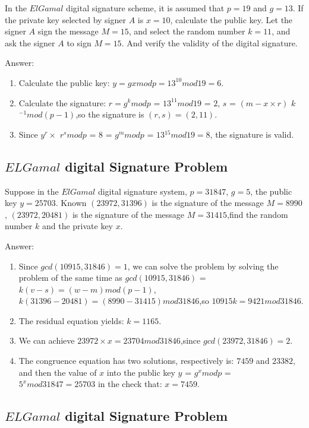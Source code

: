 \documentclass[paper=a4, fontsize=11pt]{scrartcl} %
\numberwithin{equation}{section} %
\numberwithin{figure}{section} %
\numberwithin{table}{section} %
\begin{document}
In the $ElGamal$ digital signature scheme, it is assumed that $p = 19$ and $g = 13$. If the private key selected by signer $A$ is $x = 10$, calculate the public key. Let the signer $A$ sign the message $M = 15$, and select the random number $k = 11$, and ask the signer $A$ to sign $M = 15$. And verify the validity of the digital signature.

Answer:
\begin{enumerate}
\item Calculate the public key: $y = gx mod p = 13^10 mod 19 = 6$.
\item Calculate the signature: $r=g^k mod p$ = $13^11mod 19$ = $2$, $s$ = $(m-x \times r)$ $k$$^{-1} mod (p-1)$,so the signature is $(r,s)=(2, 11)$.
\item Since $y ^ r \times $ $r^s mod p$ = 8 = $g^m mod p$ = $13$$^{15} mod 19 = 8$, the signature is valid.
\end{enumerate}


\subsection{$ELGamal$ digital Signature Problem \uppercase\expandafter{}}

Suppose in the $ElGamal$ digital signature system, $p = 31847$, $g = 5$, the public key $y = 25703$. Known $(23972,31396)$ is the signature of the message $M=8990$, $(23972,20481)$ is the signature of the message $M = 31415$,find the random number $k$ and the private key $x$.

Answer:
\begin{enumerate}
\item Since $gcd (10915, 31846) = 1$, we can solve the problem by solving the problem of the same time  as $gcd (10915, 31846)$ =$ k (v-s) = (w-m) mod (p-1)$,$k (31396-20481) = (8990-31415) mod 31846$,so $10915k = 9421 mod 31846$.
\item The residual equation yields: $k = 1165$. 
\item We can achieve $23972 \times x = 23704 mod 31846$,since $gcd (23972, 31846) = 2$.
\item The congruence equation has two solutions, respectively is: $7459$ and $23382$, and then the value of $x$ into the public key $y$ = $g^x mod p$ = $5^x mod 31847 = 25703$ in the check that: $x = 7459$.
\end{enumerate}


\subsection{$ELGamal$ digital Signature Problem \uppercase\expandafter{}}
\end{document}
